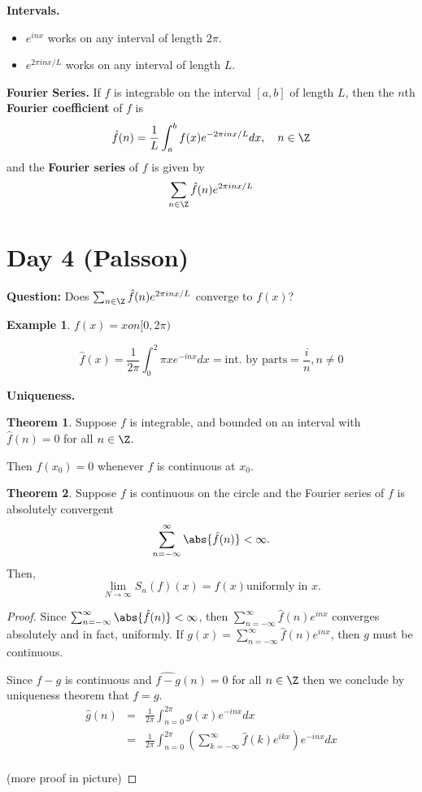 \documentclass[a5paper]{article}
\theoremstyle{definition}%
\newtheorem*{theorem*}{Theorem} %
\newtheorem*{example*}{Example}
\numberwithin{exercise}{section}
\theoremstyle{remark}%
\begin{document}
\textbf{Intervals.}
\begin{itemize}
\item $e^{inx}$ works on any interval of length $2\pi$. 
\item $e^{2\pi inx/L}$ works on any interval of length $L$. 
\end{itemize}

\begin{highlight}
\textbf{Fourier Series.} If $f$ is integrable on the interval $[a,b]$ of length $L$, then the $n$th \textbf{Fourier coefficient} of $f$ is 
$$\hat{f}(n)=\frac{1}{L} \int_a^b f(x) e^{-2\pi inx/L} dx, \quad n\in \Z$$
and the \textbf{Fourier series} of $f$ is given by 
$$\sum_{n\in\Z} \hat{f}(n)e^{2\pi inx/L}$$
\end{highlight}

\section{Day 4 (Palsson)}

\textbf{Question:} Does 
$\sum_{n\in\Z} \hat{f}(n)e^{2\pi inx/L}$
converge to $f(x)$? 

\begin{example*}
$f(x)=x on [0,2\pi)$

$$\hat{f}(x)=\frac{1}{2\pi}\int_0^2\pi x e^{-inx}dx = \text{int. by parts} = \frac{i}{n}, n\neq 0$$
\end{example*}

\textbf{Uniqueness.}
\begin{highlight}
\begin{theorem*}
Suppose $f$ is integrable, and bounded on an interval with $\hat{f}(n)=0$ for all $n\in\Z$.

Then $f(x_0)=0$ whenever $f$ is continuous at $x_0$. 
\end{theorem*}
\end{highlight}

\begin{highlight}
\begin{theorem*}
Suppose $f$ is continuous on the circle and the Fourier series of $f$ is absolutely convergent 
$$\sum_{n=-\infty}^\infty\abs{\hat{f}(n)}<\infty.$$
Then, 
$$\lim_{N\to\infty}S_n(f)(x)=f(x) \text{uniformly in }x.$$
\end{theorem*}
\end{highlight}
\begin{proof}
Since $\sum_{n=-\infty}^\infty\abs{\hat{f}(n)}<\infty$, then $\sum_{n=-\infty}^\infty{\hat{f}(n)e^{inx}}$ converges absolutely and in fact, uniformly. If $g(x)=\sum_{n=-\infty}^\infty{\hat{f}(n)e^{inx}}$, then $g$ must be continuous. 

Since $f-g$ is continuous and $\hat{f-g}(n)=0$ for all $n\in\Z$ then we conclude by uniqueness theorem that $f=g$. 
\[\begin{array}{rcl}
\hat{g}(n)&=&\frac{1}{2\pi}\int_{n=0}^{2\pi}g(x){e^{-inx}}dx\\
&=&\frac{1}{2\pi}\int_{n=0}^{2\pi}(\sum_{k=-\infty}^\infty{\hat{f}(k)e^{ikx}}){e^{-inx}}dx\\
\end{array}\]

(more proof in picture)
\end{proof}
\end{document}
